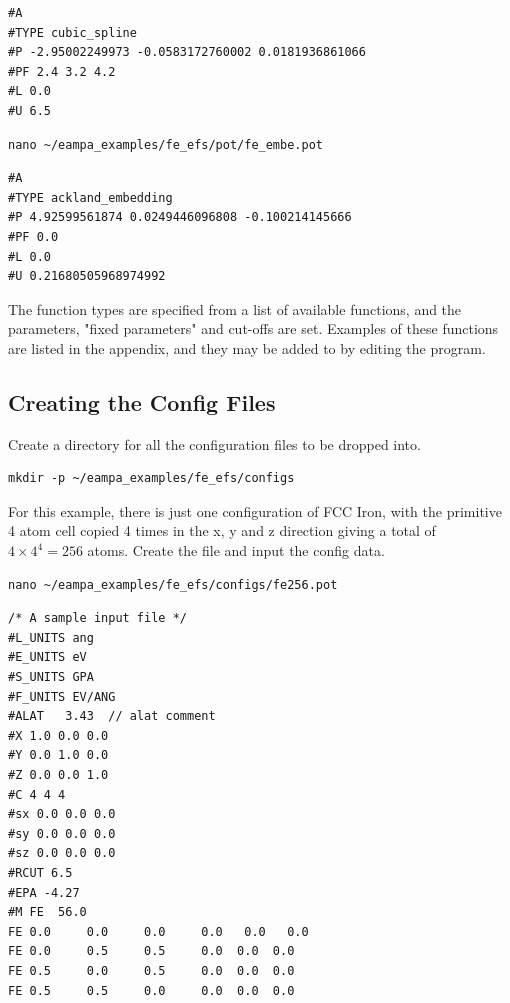 \documentclass[12pt,twoside]{manual}
\begin{document}
\begin{lstlisting}
#A
#TYPE cubic_spline
#P -2.95002249973 -0.0583172760002 0.0181936861066
#PF 2.4 3.2 4.2
#L 0.0
#U 6.5
\end{lstlisting}

\begin{lstlisting}
nano ~/eampa_examples/fe_efs/pot/fe_embe.pot
\end{lstlisting}

\begin{lstlisting}
#A
#TYPE ackland_embedding
#P 4.92599561874 0.0249446096808 -0.100214145666
#PF 0.0
#L 0.0
#U 0.21680505968974992
\end{lstlisting}

The function types are specified from a list of available functions, and the parameters, "fixed parameters" and cut-offs are set.  Examples of these functions are listed in the appendix, and they may be added to by editing the program.



\subsection{Creating the Config Files}

Create a directory for all the configuration files to be dropped into.  

\begin{lstlisting}
mkdir -p ~/eampa_examples/fe_efs/configs
\end{lstlisting}

For this example, there is just one configuration of FCC Iron, with the primitive 4 atom cell copied 4 times in the x, y and z direction giving a total of $4 \times 4^4 = 256$ atoms.  Create the file and input the config data.

\begin{lstlisting}
nano ~/eampa_examples/fe_efs/configs/fe256.pot
\end{lstlisting}

\begin{lstlisting}
/* A sample input file */
#L_UNITS ang
#E_UNITS eV
#S_UNITS GPA
#F_UNITS EV/ANG
#ALAT 	3.43  // alat comment
#X 1.0 0.0 0.0
#Y 0.0 1.0 0.0
#Z 0.0 0.0 1.0
#C 4 4 4
#sx 0.0 0.0 0.0
#sy 0.0 0.0 0.0
#sz 0.0 0.0 0.0
#RCUT 6.5
#EPA -4.27
#M FE  56.0
FE 0.0     0.0     0.0     0.0   0.0   0.0
FE 0.0     0.5     0.5     0.0  0.0  0.0 
FE 0.5     0.0     0.5     0.0  0.0  0.0
FE 0.5     0.5     0.0     0.0  0.0  0.0
\end{lstlisting}
\end{document}
